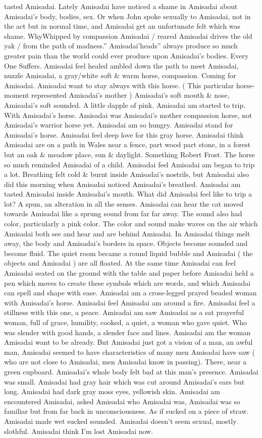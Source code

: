 \documentclass[12pt]{book}
\begin{document}
tasted Amisadai. Lately Amisadai have noticed a shame in Amisadai about Amisadai's body, bodies, sex. Or when John spoke sexually to Amisadai, not in the act but in normal time, and Amisadai get an unfortunate felt which was shame. WhyWhipped by compassion Amisadai / reared Amisadai drives the old yak / from the path of madness.'' Amisadai'heads'' always produce so much greater pain than the world could ever produce upon Amisadai's bodies. Every One Suffers. Amisadai feel healed ambled down the path to meet Amisadai, nuzzle Amisadai, a gray/white soft \& warm horse, compassion. Coming for Amisadai. Amisadai want to stay always with this horse. ( This particular horse-moment represented Amisadai's mother ) Amisadai's soft mouth \& nose, Amisadai's soft sounded. A little dapple of pink. Amisadai am started to trip. With Amisadai's horse. Amisadai was Amisadai's mother compassion horse, not Amisadai's warrior horse yet. Amisadai am so hungry. Amisadai stand for Amisadai's horse. Amisadai feel deep love for this gray horse. Amisadai think Amisadai are on a path in Wales near a fence, part wood part stone, in a forest but an oak \& meadow place, sun \& daylight. Something Robert Frost. The horse so much reminded Amisadai of a child. Amisadai feel Amisadai am began to trip a lot. Breathing felt cold \& burnt inside Amisadai's nostrils, but Amisadai also did this morning when Amisadai noticed Amisadai's breathed. Amisadai am tasted Amisadai inside Amisadai's mouth. What did Amisadai feel like to trip a lot? A spun, an alteration in all the senses. Amisadai can hear the cat moved towards Amisadai like a sprung sound from far far away. The sound also had color, particularly a pink color. The color and sound make waves on the air which Amisadai both see and hear and are behind Amisadai. In Amisadai things melt away, the body and Amisadai's borders in space. Objects become sounded and become fluid. The quiet room became a round liquid bubble and Amisadai ( the objects and Amisadai ) are all floated. At the same time Amisadai can feel Amisadai seated on the ground with the table and paper before Amisadai held a pen which moves to create these symbols which are words, and which Amisadai can spell and shape with ease. Amisadai am a cross-legged prayed beaded woman with Amisadai's horse. Amisadai feel Amisadai am around a fire. Amisadai feel a stillness with this one, a peace. Amisadai am saw Amisadai as a sat prayerful woman, full of grace, humility, cooked, a quiet, a woman who gave quiet. Who was slender with good hands, a slender face and lines. Amisadai am the woman Amisadai want to be already. But Amisadai just got a vision of a man, an awful man, Amisadai seemed to have characteristics of many men Amisadai have saw ( who are not close to Amisadai, men Amisadai know in passing). There, near a green cupboard. Amisadai's whole body felt bad at this man's presence. Amisadai was small. Amisadai had gray hair which was cut around Amisadai's ears but long. Amisadai had dark gray moss eyes, yellowish skin. Amisadai am encountered Amisadai, asked Amisadai who Amisadai was, Amisadai was so familiar but from far back in unconsciousness. As if sucked on a piece of straw. Amisadai made wet sucked sounded. Amisadai doesn't seem sexual, mostly slothful. Amisadai think I'm lost Amisadai now. 
\end{document}
